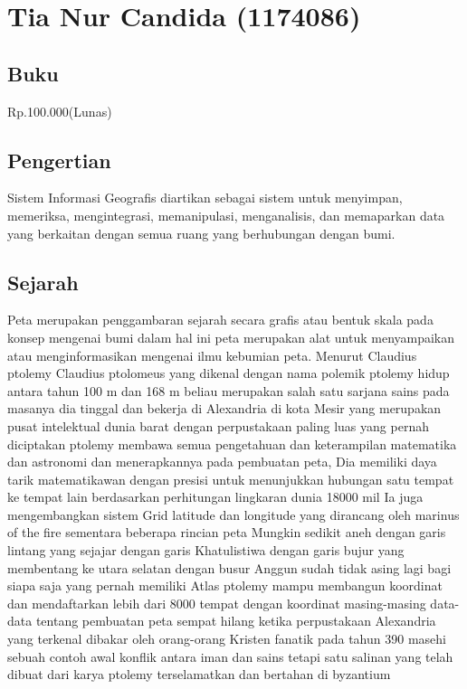 \section{Tia Nur Candida (1174086)}
\subsection{Buku}
Rp.100.000(Lunas)
\subsection{Pengertian}
	Sistem Informasi Geografis diartikan sebagai sistem untuk menyimpan, memeriksa, mengintegrasi, memanipulasi, menganalisis, dan memaparkan data yang berkaitan dengan semua ruang yang berhubungan dengan bumi. 

\subsection{Sejarah}
	Peta merupakan penggambaran sejarah secara grafis atau bentuk skala pada konsep mengenai bumi dalam hal ini peta merupakan alat untuk menyampaikan atau menginformasikan mengenai ilmu kebumian peta. Menurut Claudius ptolemy Claudius ptolomeus yang dikenal dengan nama polemik ptolemy hidup antara tahun 100 m dan 168 m beliau merupakan salah satu sarjana sains pada masanya dia tinggal dan bekerja di Alexandria di kota Mesir yang merupakan pusat intelektual dunia barat dengan perpustakaan paling luas yang pernah diciptakan ptolemy membawa semua pengetahuan dan keterampilan matematika dan astronomi dan menerapkannya pada pembuatan peta, Dia memiliki daya tarik matematikawan dengan presisi untuk menunjukkan hubungan satu tempat ke tempat lain berdasarkan perhitungan lingkaran dunia 18000 mil Ia juga mengembangkan sistem Grid latitude dan longitude yang dirancang oleh marinus of the fire sementara beberapa rincian peta Mungkin sedikit aneh dengan garis lintang yang sejajar dengan garis Khatulistiwa dengan garis bujur yang membentang ke utara selatan dengan busur Anggun sudah tidak asing lagi bagi siapa saja yang pernah memiliki Atlas ptolemy mampu membangun koordinat dan mendaftarkan lebih dari 8000 tempat dengan koordinat masing-masing 
data-data tentang pembuatan peta sempat hilang ketika perpustakaan Alexandria yang terkenal dibakar oleh orang-orang Kristen fanatik pada tahun 390 masehi sebuah contoh awal konflik antara iman dan sains tetapi satu salinan yang telah dibuat dari karya ptolemy terselamatkan dan bertahan di byzantium

